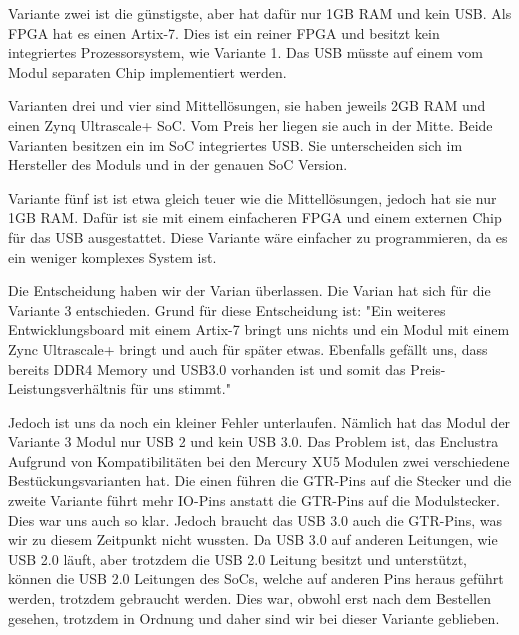 \documentclass{article}
\begin{document}
    Variante zwei ist die günstigste, aber hat dafür nur 1GB RAM und kein USB. Als FPGA hat es einen Artix-7. Dies ist ein reiner FPGA und besitzt kein integriertes Prozessorsystem, wie Variante 1. Das USB müsste auf einem vom Modul separaten Chip implementiert werden. 
    
    Varianten drei und vier sind Mittellösungen, sie haben jeweils 2GB RAM und einen Zynq Ultrascale+ SoC. Vom Preis her liegen sie auch in der Mitte. Beide Varianten besitzen ein im SoC integriertes USB. Sie unterscheiden sich im Hersteller des Moduls und in der genauen SoC Version.
    
    Variante fünf ist ist etwa gleich teuer wie die Mittellösungen, jedoch hat sie nur 1GB RAM. Dafür ist sie mit einem einfacheren FPGA und einem externen Chip für das USB ausgestattet. Diese Variante wäre einfacher zu programmieren, da es ein weniger komplexes System ist.

    Die Entscheidung haben wir der Varian überlassen. Die Varian hat sich für die Variante 3 entschieden. Grund für diese Entscheidung ist: "Ein weiteres Entwicklungsboard mit einem Artix-7 bringt uns nichts und ein Modul mit einem Zync Ultrascale+ bringt und auch für später etwas. Ebenfalls gefällt uns, dass bereits DDR4 Memory und USB3.0 vorhanden ist und somit das Preis-Leistungsverhältnis für uns stimmt."

    Jedoch ist uns da noch ein kleiner Fehler unterlaufen. Nämlich hat das Modul der Variante 3 Modul nur USB 2 und kein USB 3.0. Das Problem ist, das Enclustra Aufgrund von Kompatibilitäten bei den Mercury XU5 Modulen zwei verschiedene Bestückungsvarianten hat. Die einen führen die GTR-Pins auf die Stecker und die zweite Variante führt mehr IO-Pins anstatt die GTR-Pins auf die Modulstecker. Dies war uns auch so klar. Jedoch braucht das USB 3.0 auch die GTR-Pins, was wir zu diesem Zeitpunkt nicht wussten. Da USB 3.0 auf anderen Leitungen, wie USB 2.0 läuft, aber trotzdem die USB 2.0 Leitung besitzt und unterstützt, können die USB 2.0 Leitungen des SoCs, welche auf anderen Pins heraus geführt werden, trotzdem gebraucht werden. Dies war, obwohl erst nach dem Bestellen gesehen, trotzdem in Ordnung und daher sind wir bei dieser Variante geblieben.
    
\end{document}
